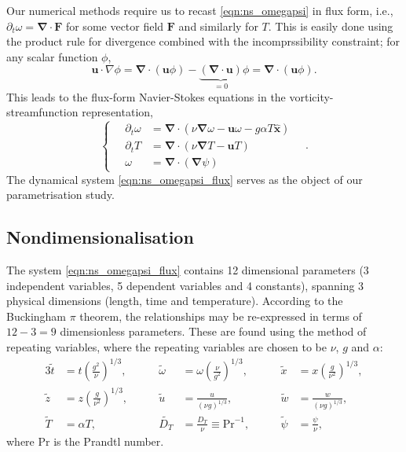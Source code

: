 \documentclass{article}
\renewcommand\vec{\bm}
\newcommand{\uvec}[1]{\vec{\hat{#1}}}
\newcommand{\grad}{\vec{\nabla}}
\newcommand{\prandtl}{\ensuremath{\mathrm{Pr}}}
\begin{document}
Our numerical methods require us to recast \autoref{eqn:ns_omegapsi} in flux
form, i.e., $\partial_t \omega = \grad \cdot \vec{F}$ for some vector field
$\vec{F}$ and similarly for $T$. This is easily done using the product
rule for divergence combined with the incomprssibility constraint;
for any scalar function $\phi$,
\[
    \vec{u} \cdot \nabla \phi = \grad \cdot (\vec{u} \phi)
        - \underbrace{(\grad \cdot \vec{u})}_{=0} \phi
        = \grad \cdot (\vec{u} \phi).
\]
This leads to the flux-form Navier-Stokes equations in the
vorticity-streamfunction representation,
\begin{equation} \label{eqn:ns_omegapsi_flux}
    \left\{ \quad
    \begin{aligned}
        \partial_t \omega &= \grad \cdot (\nu \grad \omega - \vec{u} \omega
            - g \alpha T \uvec{x}) \\
        \partial_t T &= \grad \cdot (\nu \grad T - \vec{u} T) \\
        \omega &= \grad \cdot (\grad \psi)
    \end{aligned}
    \right. \quad .
\end{equation}
The dynamical system \autoref{eqn:ns_omegapsi_flux} serves as the object of
our parametrisation study.

\subsection{Nondimensionalisation}
The system \autoref{eqn:ns_omegapsi_flux} contains 12 dimensional parameters
(3 independent variables, 5 dependent variables and 4 constants), spanning 3
physical dimensions (length, time and temperature). According to the
Buckingham $\pi$ theorem, the relationships may be re-expressed in terms of
$12-3=9$ dimensionless parameters. These are found using the method of
repeating variables, where the repeating variables are chosen to be
$\nu$, $g$ and $\alpha$:
\begin{alignat*}{3}
    \tilde{t} &= t \left( \frac{g^2}{\nu} \right)^{1/3},
        & \qquad \tilde{\omega} &= \omega \left( \frac{\nu}{g^2} \right)^{1/3},
        & \qquad \tilde{x} &= x \left( \frac{g}{\nu^2} \right)^{1/3}, \\
    \tilde{z} &= z \left( \frac{g}{\nu^2} \right)^{1/3},
        & \qquad \tilde{u} &= \frac{u}{(\nu g)^{1/3}},
        & \qquad \tilde{w} &= \frac{w}{(\nu g)^{1/3}}, \\
    \tilde{T} &= \alpha T,
        & \qquad \tilde{D_T} &= \frac{D_T}{\nu} \equiv \prandtl^{-1},
        & \qquad \tilde{\psi} &= \frac{\psi}{\nu},
\end{alignat*}
where $\prandtl$ is the Prandtl number.
\end{document}
